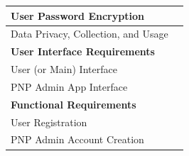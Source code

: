 \begin{table}[h!]
\begin{tabular}{|ll|}
\multicolumn{1}{|l|}{User Password Encryption}                                                                                                                      &                                                                 {\hspace{1.75cm}}                           \\ \hline
\multicolumn{1}{|l|}{Data Privacy, Collection, and Usage}                                                                                                           &                                                          {\hspace{1.75cm}}                                  \\ \hline
\multicolumn{2}{|l|}{\textbf{User Interface Requirements}}                                                                                                                                                                                                       \\ \hline
\multicolumn{1}{|l|}{User (or Main) Interface}                                                                                                                      &                                                             {\hspace{1.75cm}}                               \\ \hline
\multicolumn{1}{|l|}{PNP Admin App Interface}                                                                                                                       &                                                             {\hspace{1.75cm}}                               \\ \hline
\multicolumn{2}{|l|}{\textbf{Functional Requirements}}                                                                                                                                                                                                           \\ \hline
\multicolumn{1}{|l|}{User Registration}                                                                                                                             &                                                               {\hspace{1.75cm}}                             \\ \hline
\multicolumn{1}{|l|}{PNP Admin Account Creation}                                                                                                                    &                                                               {\hspace{1.75cm}}                             \\ \hline

\end{tabular}
\end{table}
